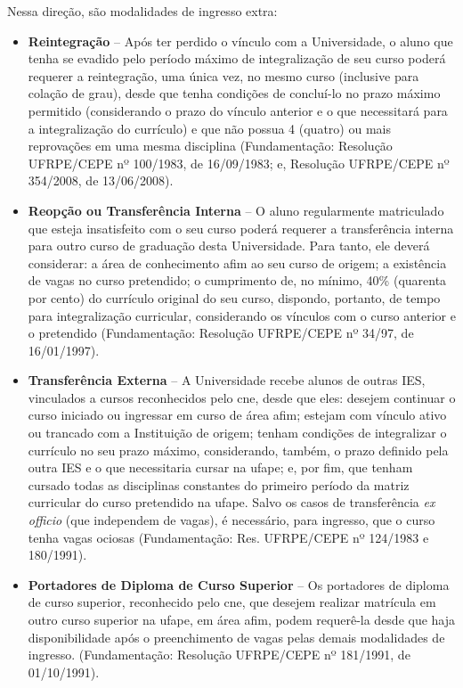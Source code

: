 \documentclass[
	12pt,				%
	openright,			%
  oneside,     %
	a4paper,			%
 hyphens,
	chapter=TITLE,		%
	english,			%
	french,				%
	spanish,			%
	brazil				%
	]{abntex2}
\begin{document}
Nessa direção, são modalidades de ingresso extra:

\begin{itemize}
    \item \textbf{Reintegração} – Após ter perdido o vínculo com a Universidade, o aluno que tenha se evadido pelo período máximo de integralização de seu curso poderá requerer a reintegração, uma única vez, no mesmo curso (inclusive para colação de grau), desde que tenha condições de concluí-lo no prazo máximo permitido (considerando o prazo do vínculo anterior e o que necessitará para a integralização do currículo) e que não possua 4 (quatro) ou mais reprovações em uma mesma disciplina (Fundamentação: Resolução UFRPE/CEPE nº 100/1983, de 16/09/1983; e, Resolução UFRPE/CEPE nº 354/2008, de 13/06/2008).
    \item \textbf{Reopção ou Transferência Interna} – O aluno regularmente matriculado que esteja insatisfeito com o seu curso poderá requerer a transferência interna para outro curso de graduação desta Universidade. Para tanto, ele deverá considerar: a área de conhecimento afim ao seu curso de origem; a existência de vagas no curso pretendido; o cumprimento de, no mínimo, 40\% (quarenta por cento) do currículo original do seu curso, dispondo, portanto, de tempo para integralização curricular, considerando os vínculos com o curso anterior e o pretendido (Fundamentação: Resolução UFRPE/CEPE nº 34/97, de 16/01/1997).
    \item \textbf{Transferência Externa} – A Universidade recebe alunos de outras IES, vinculados a cursos reconhecidos pelo \acrfull{cne}, desde que eles: desejem continuar o curso iniciado ou ingressar em curso de área afim; estejam com vínculo ativo ou trancado com a Instituição de origem; tenham condições de integralizar o currículo no seu prazo máximo, considerando, também, o prazo definido pela outra IES e o que necessitaria cursar na \acrshort{ufape}; e, por fim, que tenham cursado todas as disciplinas constantes do primeiro período da matriz curricular do curso pretendido na \acrshort{ufape}. Salvo os casos de transferência \textit{ex officio} (que independem de vagas), é necessário, para ingresso, que o curso tenha vagas ociosas (Fundamentação: Res. UFRPE/CEPE nº 124/1983 e 180/1991).
    \item \textbf{Portadores de Diploma de Curso Superior} – Os portadores de diploma de curso superior, reconhecido pelo \acrshort{cne}, que desejem realizar matrícula em outro curso superior na \acrshort{ufape}, em área afim, podem requerê-la desde que haja disponibilidade após o preenchimento de vagas pelas demais modalidades de ingresso. (Fundamentação: Resolução UFRPE/CEPE nº 181/1991, de 01/10/1991).
\end{itemize}
\end{document}
